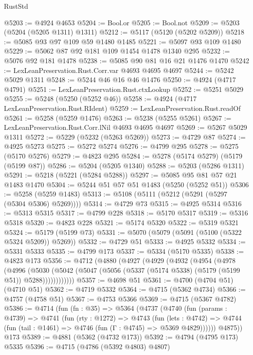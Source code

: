 \begin{lexlean}{RustStd}
\begin{coremodule}
@5203 := @4924 @4653
@5204 := Bool.or
@5205 := Bool.not
@5209 := @5203 (@5204 (@5205 @1311) @1311)
@5212 := @5117 (@5120 (@5202 @5209))
@5218 := @5085 @93 @97 @109 @59 @1480 @1485
@5221 := @5097 @93 @109 @1480
@5229 := @5062 @87 @92 @181 @109 @1454 @1478 @1340 @295
@5232 := @5076 @92 @181 @1478
@5238 := @5085 @90 @81 @16 @21 @1476 @1470
@5242 := LexLeanPreservation.Rust.Corr.var @4693 @4695 @4697
@5244 := @5242 @5029 @1311
@5248 := @5244 @46 @16 @46 @1476
@5250 := @4924 (@4717 @4791)
@5251 := LexLeanPreservation.Rust.ctxLookup
@5252 := @5251 @5029
@5255 := @5248 (@5250 (@5252 @46))
@5258 := @4924 (@4717 LexLeanPreservation.Rust.RIdent)
@5259 := LexLeanPreservation.Rust.readOf
@5261 := @5258 (@5259 @1476)
@5263 := @5238 (@5255 @5261)
@5267 := LexLeanPreservation.Rust.Corr.lNil @4693 @4695 @4697
@5269 := @5267 @5029 @1311
@5272 := @5229 (@5232 (@5263 @5269))
@5273 := @4729 @87
@5274 := @4925 @5273
@5275 := @5272 @5274
@5276 := @4799 @295
@5278 := @5275 (@5170 @5276)
@5279 := @4823 @295
@5284 := @5278 (@5174 @5279) (@5179 (@5199 @87))
@5286 := @5204 (@5205 @1340)
@5288 := @5203 (@5286 @1311)
@5291 := @5218 (@5221 (@5284 @5288))
@5297 := @5085 @95 @81 @57 @21 @1483 @1470
@5304 := @5244 @51 @57 @51 @1483 (@5250 (@5252 @51))
@5306 := @5258 (@5259 @1483)
@5313 := @5108 (@5111 (@5212 (@5291 (@5297 (@5304 @5306) @5269))))
@5314 := @4729 @73
@5315 := @4925 @5314
@5316 := @5313 @5315
@5317 := @4799 @228
@5318 := @5170 @5317
@5319 := @5316 @5318
@5320 := @4823 @228
@5321 := @5174 @5320
@5322 := @5319 @5321
@5324 := @5179 (@5199 @73)
@5331 := @5070 (@5079 (@5091 (@5100 (@5322 @5324 @5209)) @5269))
@5332 := @4729 @51
@5333 := @4925 @5332
@5334 := @5331 @5333
@5335 := @4799 @173
@5337 := @5334 (@5170 @5335)
@5338 := @4823 @173
@5356 := @4712
    (@4880
      (@4927
        (@4929
          (@4932
            (@4954
              (@4978
                (@4996
                  (@5030
                    (@5042 (@5047 (@5056 (@5337 (@5174 @5338) (@5179 (@5199 @51)) @5288))))))))))))
@5357 := @4698 @51
@5361 := @4700 (@4704 @51) (@4710 @51)
@5362 := @4719 @5332
@5364 := @4715 (@5362 @4734)
@5366 := @4757 (@4758 @51)
@5367 := @4753 @5366
@5369 := @4715 (@5367 @4782)
@5386 := @4714
    (fun (fn : @35) =>
    @5364
      (@4737
        (@4740
          (fun (params : @4739) =>
          @4741
            (fun (rty : @1272) =>
            @4743
              (fun (lets : @4742) =>
              @4744 (fun (tail : @1461) => @4746 (fun (Γ : @4745) => @5369 @4829))))))
        @4875))
    @173
@5389 := @4881 (@5362 (@4732 @173))
@5392 := @4794 (@4795 @173) @5335
@5396 := @4715 (@4786 (@5392 @4803) @4807)

\end{coremodule}
\end{lexlean}
